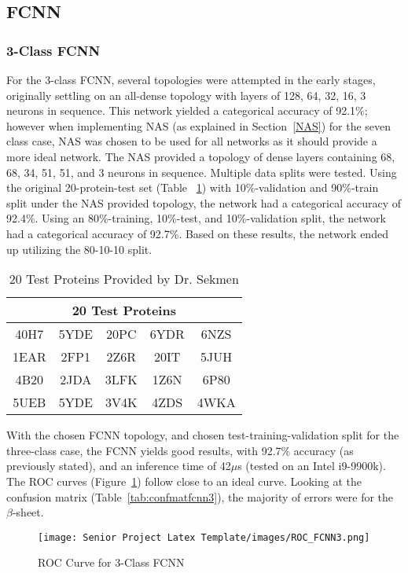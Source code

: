 \documentclass[12pt,letterpaper,oneside,reqno]{book}
\theoremstyle{plain}
\theoremstyle{definition}
\theoremstyle{plain}
\theoremstyle{remark}
\theoremstyle{plain}
\theoremstyle{definition}
\theoremstyle{plain}
\begin{document}
\subsection{FCNN}
\subsubsection{3-Class FCNN}
For the 3-class FCNN, several topologies were attempted in the early stages, originally settling on an all-dense topology with layers of 128, 64, 32, 16, 3 neurons in sequence. This network yielded a categorical accuracy of 92.1\%; however when implementing NAS (as explained in Section~\ref{NAS}) for the seven class case, NAS was chosen to be used for all networks as it should provide a more ideal network. The NAS provided a topology of dense layers containing 68, 68, 34, 51, 51, and 3 neurons in sequence. Multiple data splits were tested. Using the original 20-protein-test set (Table ~\ref{tab:20Prot}) with 10\%-validation and 90\%-train split under the NAS provided topology, the network had a categorical accuracy of 92.4\%. Using an 80\%-training, 10\%-test, and 10\%-validation split, the network had a categorical accuracy of 92.7\%. Based on these results, the network ended up utilizing the 80-10-10 split.
\begin{table}[H]
\centering
		\begin{tabular}{|c|c|c|c|c|}
				\hline
			    \multicolumn{5}{|c|}{20 Test Proteins} \\
				\hline
				40H7 & 5YDE & 20PC & 6YDR & 6NZS \\
				\hline
				1EAR & 2FP1 & 2Z6R & 20IT & 5JUH \\
				\hline
				4B20 & 2JDA & 3LFK & 1Z6N & 6P80 \\
				\hline
				5UEB & 5YDE & 3V4K & 4ZDS & 4WKA \\
				\hline
		\end{tabular}
		\caption{20 Test Proteins Provided by Dr. Sekmen}
		\label{tab:20Prot}
\end{table}
With the chosen FCNN topology, and chosen test-training-validation split for the three-class case, the FCNN yields good results, with 92.7\% accuracy (as previously stated), and an inference time of 42$\mu$s (tested on an Intel i9-9900k). The ROC curves (Figure~\ref{fig:ROCFCNN3}) follow close to an ideal curve. Looking at the confusion matrix (Table~\ref{tab:confmatfcnn3}), the majority of errors were for the $\beta$-sheet.
\begin{figure}[H]
    \centering
    \texttt{[image: Senior Project Latex Template/images/ROC\_FCNN3.png]}
    \caption{ROC Curve for 3-Class FCNN}
    \label{fig:ROCFCNN3}
\end{figure}
\end{document}
